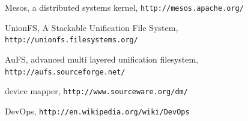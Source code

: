 \documentclass[a4paper]{article}
\begin{document}
\begin{thebibliography}{9}
	 Mesos, a distributed systems kernel,
		\verb'http://mesos.apache.org/'

	 UnionFS, A Stackable Unification File System,\\
		\verb'http://unionfs.filesystems.org/'

	 AuFS, advanced multi layered unification filesystem,\\
		\verb'http://aufs.sourceforge.net/'

	 device mapper,
		\verb'http://www.sourceware.org/dm/'

	 DevOps,
		\verb'http://en.wikipedia.org/wiki/DevOps'

\end{thebibliography}
\end{document}
